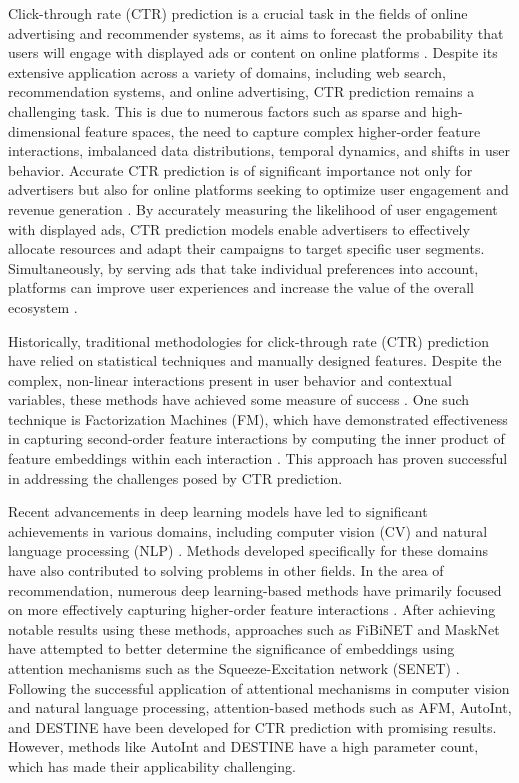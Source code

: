 \documentclass{article}
\begin{document}
Click-through rate (CTR) prediction is a crucial task in the fields of online advertising and recommender systems, as it aims to forecast the probability that users will engage with displayed ads or content on online platforms \cite{wu2019session, yu2020tagnn}. Despite its extensive application across a variety of domains, including web search, recommendation systems, and online advertising, CTR prediction remains a challenging task. This is due to numerous factors such as sparse and high-dimensional feature spaces, the need to capture complex higher-order feature interactions, imbalanced data distributions, temporal dynamics, and shifts in user behavior. Accurate CTR prediction is of significant importance not only for advertisers but also for online platforms seeking to optimize user engagement and revenue generation \cite{autoint2019}. By accurately measuring the likelihood of user engagement with displayed ads, CTR prediction models enable advertisers to effectively allocate resources and adapt their campaigns to target specific user segments. Simultaneously, by serving ads that take individual preferences into account, platforms can improve user experiences and increase the value of the overall ecosystem \cite{fignn2019, liu2015convolutional}.

Historically, traditional methodologies for click-through rate (CTR) prediction have relied on statistical techniques and manually designed features. Despite the complex, non-linear interactions present in user behavior and contextual variables, these methods have achieved some measure of success \cite{rendle2010factorization, mcmahan2013ad}. One such technique is Factorization Machines (FM), which have demonstrated effectiveness in capturing second-order feature interactions by computing the inner product of feature embeddings within each interaction \cite{rendle2010factorization}. This approach has proven successful in addressing the challenges posed by CTR prediction.

Recent advancements in deep learning models have led to significant achievements in various domains, including computer vision (CV) \cite{krizhevsky2012imagenet, simonyan2014very, szegedy2015going} and natural language processing (NLP) \cite{chai2019deep, goldberg2022neural}. Methods developed specifically for these domains have also contributed to solving problems in other fields. In the area of recommendation, numerous deep learning-based methods have primarily focused on more effectively capturing higher-order feature interactions \cite{guo2017deepfm, cheng2016wide, yu2020tagnn, lian2018xdeepfm}. After achieving notable results using these methods, approaches such as FiBiNET \cite{fibinet2019} and MaskNet \cite{masknet2021} have attempted to better determine the significance of embeddings using attention mechanisms such as the Squeeze-Excitation network (SENET) \cite{hu2018squeeze}. Following the successful application of attentional mechanisms in computer vision and natural language processing, attention-based methods such as AFM, AutoInt, and DESTINE have been developed for CTR prediction with promising results. However, methods like AutoInt and DESTINE have a high parameter count, which has made their applicability challenging.
\end{document}
